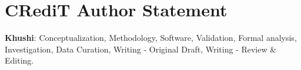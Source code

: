 \section*{CRediT Author Statement}
\textbf{Khushi}: Conceptualization, Methodology, Software, Validation, Formal analysis, Investigation, Data Curation, Writing - Original Draft, Writing - Review \& Editing.
